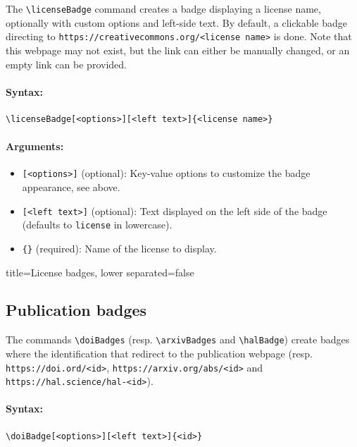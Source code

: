 The \texttt{\textbackslash licenseBadge} command creates a badge displaying a license name, optionally with custom options and left-side text.
By default, a clickable badge directing to \texttt{https://creativecommons.org/<license name>} is done.
Note that this webpage may not exist, but the link can either be manually changed, or an empty link can be provided.

\paragraph{Syntax:}
\begin{verbatim}
\licenseBadge[<options>][<left text>]{<license name>}
\end{verbatim}

\paragraph{Arguments:}
\begin{itemize}
    \item \texttt{[<options>]} (optional): Key-value options to customize the badge appearance, see above.
    \item \texttt{[<left text>]} (optional): Text displayed on the left side of the badge (defaults to \texttt{license} in lowercase).
    \item \texttt{\{<license name>\}} (required): Name of the license to display.
\end{itemize}


\begin{tcblisting}{title={License badges}, lower separated=false}
\end{tcblisting}


\subsection{Publication badges}

The commands \texttt{\textbackslash doiBadges} (resp. \texttt{\textbackslash arxivBadges} and \texttt{\textbackslash halBadge}) create badges where the identification that redirect to the publication webpage (resp. \texttt{https://doi.ord/<id>}, \texttt{https://arxiv.org/abs/<id>} and \texttt{https://hal.science/hal-<id>}).

\paragraph{Syntax:}
\begin{verbatim}
\doiBadge[<options>][<left text>]{<id>}
\end{verbatim}

